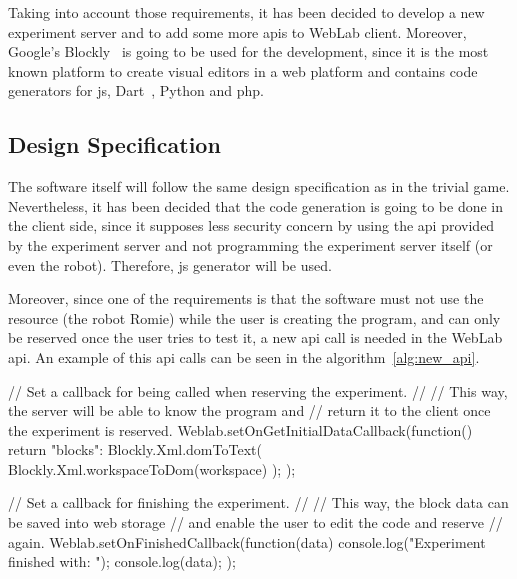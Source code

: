 Taking into account those requirements, it has been decided to develop a new experiment server and
to add some more \acrshort{api}s to WebLab client. Moreover, Google's Blockly~\cite{blockly} is
going to be used for the development, since it is the most known platform to create visual editors
in a web platform and contains code generators for \acrlong{js}, Dart~\cite{dart}, Python and
\acrshort{php}.

\subsection{Design Specification}

The software itself will follow the same design specification as in the trivial game. Nevertheless,
it has been decided that the code generation is going to be done in the client side, since it
supposes less security concern by using the \acrshort{api} provided by the experiment server and not
programming the experiment server itself (or even the robot). Therefore, \acrlong{js} generator will
be used.

Moreover, since one of the requirements is that the software must not use the resource (the robot
Romie) while the user is creating the program, and can only be reserved once the user tries to test
it, a new \acrshort{api} call is needed in the WebLab \acrshort{api}. An example of this
\acrshort{api} calls can be seen in the algorithm~\ref{alg:new_api}.

\begin{center}
\begin{minipage}{.9\textwidth}
\singlespace
{}
\begin{pyglist}[language=javascript, caption={New WebLab \acrshort{api} functions.},
	label={alg:new_api}, listingname={Algorithm}, numbers=left]
// Set a callback for being called when reserving the experiment.
//
// This way, the server will be able to know the program and
// return it to the client once the experiment is reserved.
Weblab.setOnGetInitialDataCallback(function() {
    return {"blocks": Blockly.Xml.domToText(
        Blockly.Xml.workspaceToDom(workspace)
    )};
});

// Set a callback for finishing the experiment.
//
// This way, the block data can be saved into web storage
// and enable the user to edit the code and reserve
// again.
Weblab.setOnFinishedCallback(function(data) {
    console.log("Experiment finished with: ");
    console.log(data);
});
\end{pyglist}
\end{minipage}
\end{center}

